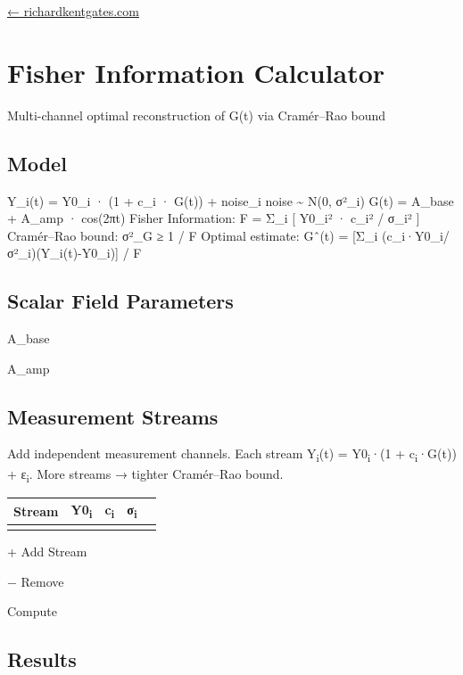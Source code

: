 \documentclass[
  10pt,
]{article}
\author{}
\date{}
\begin{document}
\href{https://richardkentgates.com}{← richardkentgates.com}

\hypertarget{fisher-information-calculator}{%
\section{Fisher Information
Calculator}\label{fisher-information-calculator}}

Multi-channel optimal reconstruction of G(t) via Cramér--Rao bound

\hypertarget{model}{%
\subsection{Model}\label{model}}

Y\_i(t) = Y0\_i · (1 + c\_i · G(t)) + noise\_i noise \textasciitilde{}
N(0, σ²\_i) G(t) = A\_base + A\_amp · cos(2πt) Fisher Information: F =
Σ\_i {[} Y0\_i² · c\_i² / σ\_i² {]} Cramér--Rao bound: σ²\_G ≥ 1 / F
Optimal estimate: Gˆ(t) = {[}Σ\_i (c\_i·Y0\_i/σ²\_i)(Y\_i(t)-Y0\_i){]} /
F

\hypertarget{scalar-field-parameters}{%
\subsection{Scalar Field Parameters}\label{scalar-field-parameters}}

A\_base

A\_amp

\hypertarget{measurement-streams}{%
\subsection{Measurement Streams}\label{measurement-streams}}

Add independent measurement channels. Each stream Y\textsubscript{i}(t)
= Y0\textsubscript{i}·(1 + c\textsubscript{i}·G(t)) +
ε\textsubscript{i}. More streams → tighter Cramér--Rao bound.

\begin{longtable}[]{@{}lllll@{}}
\toprule\noalign{}
Stream & Y0\textsubscript{i} & c\textsubscript{i} & σ\textsubscript{i}
& \\
\midrule\noalign{}
\endhead
\bottomrule\noalign{}
\endlastfoot
\end{longtable}

+ Add Stream

− Remove

Compute

\hypertarget{results-card}{}
\hypertarget{results}{%
\subsection{Results}\label{results}}
\end{document}

